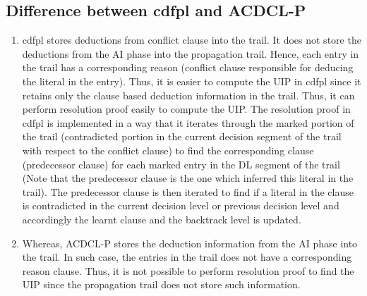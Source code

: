 \documentclass[a4paper,conference]{llncs}
\begin{document}
\subsection{Difference between cdfpl and ACDCL-P}
\begin{enumerate}
\item cdfpl stores deductions from conflict clause into the trail. It does not 
store the deductions from the AI phase into the propagation trail. Hence, each 
entry in the trail has a corresponding reason (conflict clause responsible for 
deducing the literal in the entry). Thus, it is easier to compute the UIP in
cdfpl since it retains only the clause based deduction information in the trail. 
Thus, it can perform resolution proof easily to compute the UIP. The resolution 
proof in cdfpl is implemented in a way that it iterates through the marked
portion of the trail (contradicted portion in the current decision segment of
the trail with respect to the conflict clause) to find the corresponding clause 
(predecessor clause) for each marked entry in the DL segment of the trail 
(Note that the predecessor clause is the one which inferred this literal in the 
trail). The predecessor clause is then iterated to find if a literal in the 
clause is contradicted in the current decision level or previous decision level 
and accordingly the learnt clause and the backtrack level is updated. 
  
\item Whereas, ACDCL-P stores the deduction information from the AI phase into the 
trail. In such case, the entries in the trail does not have a corresponding
reason clause. Thus, it is not possible to perform resolution proof to find the 
UIP since the propagation trail does not store such information.   
\end{enumerate}
\end{document}
